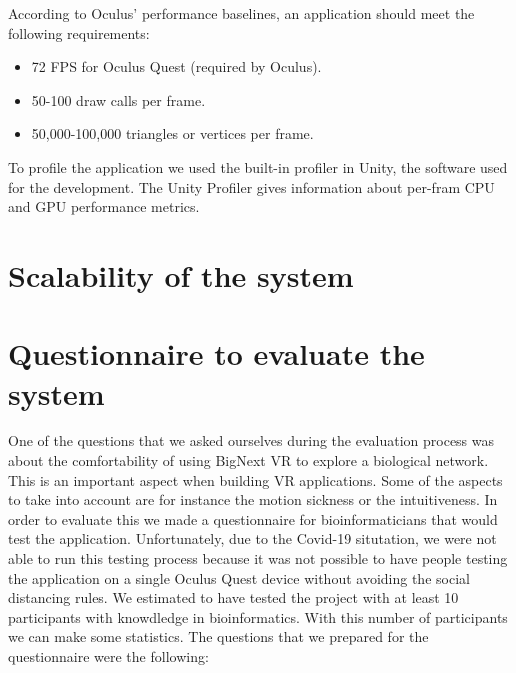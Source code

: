 According to Oculus' performance baselines\cite{oculus_performance_baselines}, an application should meet the following requirements:
\begin{itemize}
  \item 72 FPS for Oculus Quest (required by Oculus).
  \item 50-100 draw calls per frame.
  \item 50,000-100,000 triangles or vertices per frame.
\end{itemize}

To profile the application we used the built-in profiler in Unity, the software used for the development. The Unity Profiler gives information about per-fram CPU and GPU performance metrics.

\section{Scalability of the system}

\section{Questionnaire to evaluate the system}
One of the questions that we asked ourselves during the evaluation process was about the comfortability of using BigNext VR to explore a biological network. This is an important aspect when building VR applications. Some of the aspects to take into account are for instance the motion sickness or the intuitiveness. In order to evaluate this we made a questionnaire for bioinformaticians that would test the application. Unfortunately, due to the Covid-19 situtation\cite{covid_19}, we were not able to run this testing process because it was not possible to have people testing the application on a single Oculus Quest device without avoiding the social distancing rules.
We estimated to have tested the project with at least 10 participants with knowdledge in bioinformatics. With this number of participants we can make some statistics. The questions that we prepared for the questionnaire were the following:\\

